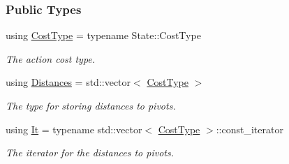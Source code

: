 \subsubsection*{Public Types}
\begin{DoxyCompactItemize}
\item 
using \hyperlink{structslb_1_1ext_1_1heuristic_1_1differential_1_1DistancesToPivots_a8b02847b92f84e1d3d97b71c91409e62}{Cost\+Type} = typename State\+::\+Cost\+Type\hypertarget{structslb_1_1ext_1_1heuristic_1_1differential_1_1DistancesToPivots_a8b02847b92f84e1d3d97b71c91409e62}{}\label{structslb_1_1ext_1_1heuristic_1_1differential_1_1DistancesToPivots_a8b02847b92f84e1d3d97b71c91409e62}

\begin{DoxyCompactList}\small\item\em The action cost type. \end{DoxyCompactList}\item 
using \hyperlink{structslb_1_1ext_1_1heuristic_1_1differential_1_1DistancesToPivots_af1bead3d0ade455bbe8901d3adfbd62b}{Distances} = std\+::vector$<$ \hyperlink{structslb_1_1ext_1_1heuristic_1_1differential_1_1DistancesToPivots_a8b02847b92f84e1d3d97b71c91409e62}{Cost\+Type} $>$\hypertarget{structslb_1_1ext_1_1heuristic_1_1differential_1_1DistancesToPivots_af1bead3d0ade455bbe8901d3adfbd62b}{}\label{structslb_1_1ext_1_1heuristic_1_1differential_1_1DistancesToPivots_af1bead3d0ade455bbe8901d3adfbd62b}

\begin{DoxyCompactList}\small\item\em The type for storing distances to pivots. \end{DoxyCompactList}\item 
using \hyperlink{structslb_1_1ext_1_1heuristic_1_1differential_1_1DistancesToPivots_aa307465e8919ae3f3e93f5aa1f6e4b6f}{It} = typename std\+::vector$<$ \hyperlink{structslb_1_1ext_1_1heuristic_1_1differential_1_1DistancesToPivots_a8b02847b92f84e1d3d97b71c91409e62}{Cost\+Type} $>$\+::const\+\_\+iterator\hypertarget{structslb_1_1ext_1_1heuristic_1_1differential_1_1DistancesToPivots_aa307465e8919ae3f3e93f5aa1f6e4b6f}{}\label{structslb_1_1ext_1_1heuristic_1_1differential_1_1DistancesToPivots_aa307465e8919ae3f3e93f5aa1f6e4b6f}

\begin{DoxyCompactList}\small\item\em The iterator for the distances to pivots. \end{DoxyCompactList}\end{DoxyCompactItemize}
